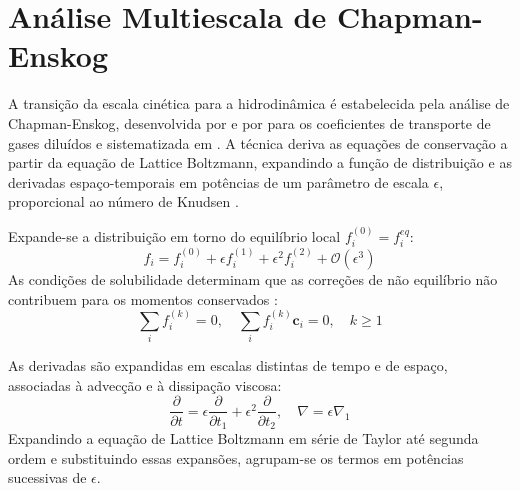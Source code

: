 
\section{Análise Multiescala de Chapman-Enskog}\label{sec:lbm-chapman-enskog}

A transição da escala cinética para a hidrodinâmica é estabelecida pela análise de Chapman-Enskog, desenvolvida por \textcite{Chapman1916} e por \textcite{Enskog1917} para os coeficientes de transporte de gases diluídos e sistematizada em \textcite{Chapman1970}.
A técnica deriva as equações de conservação a partir da equação de Lattice Boltzmann, expandindo a função de distribuição e as derivadas espaço-temporais em potências de um parâmetro de escala $\epsilon$, proporcional ao número de Knudsen \parencite{Chen1998, Rathnayake2024}.

Expande-se a distribuição em torno do equilíbrio local $f_i^{(0)} = f_i^{eq}$:
\begin{equation}
    f_i = f_i^{(0)} + \epsilon f_i^{(1)} + \epsilon^2 f_i^{(2)} + \mathcal{O}(\epsilon^3)
\end{equation}
As condições de solubilidade determinam que as correções de não equilíbrio não contribuem para os momentos conservados \parencite{Kruger2017}:
\begin{equation}
    \sum_i f_i^{(k)} = 0, \quad \sum_i f_i^{(k)} \mathbf{c}_i = 0, \quad k \ge 1
\end{equation}

As derivadas são expandidas em escalas distintas de tempo e de espaço, associadas à advecção e à dissipação viscosa:
\begin{equation}
    \frac{\partial}{\partial t} = \epsilon \frac{\partial}{\partial t_1} + \epsilon^2 \frac{\partial}{\partial t_2}, \quad \nabla = \epsilon \nabla_1
\end{equation}
Expandindo a equação de Lattice Boltzmann em série de Taylor até segunda ordem e substituindo essas expansões, agrupam-se os termos em potências sucessivas de $\epsilon$.

